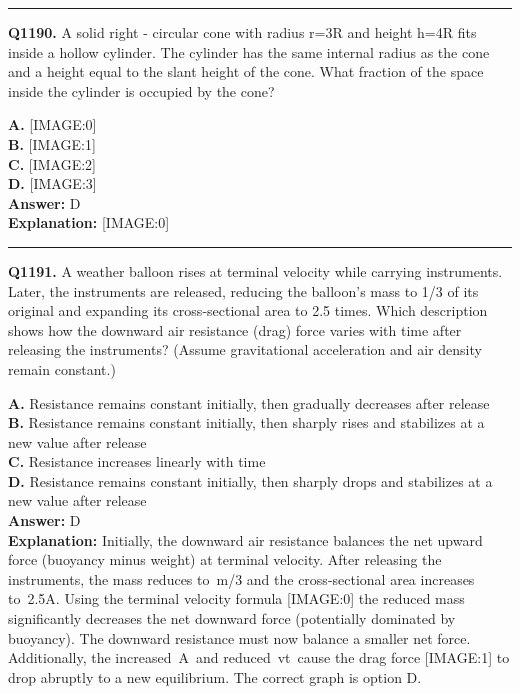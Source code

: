 \documentclass[12pt]{article}
\begin{document}
\hrule
\vspace{1em}


\noindent
\textbf{Q1190.} A solid right - circular cone with radius r=3R and height h=4R fits inside a hollow cylinder. The cylinder has the same internal radius as the cone and a height equal to the slant height of the cone. What fraction of the space inside the cylinder is occupied by the cone?



\textbf{A.} [IMAGE:0] \\
\textbf{B.} [IMAGE:1] \\
\textbf{C.} [IMAGE:2] \\
\textbf{D.} [IMAGE:3] \\

\textbf{Answer:} D \\
\textbf{Explanation:} [IMAGE:0]

\hrule
\vspace{1em}


\noindent
\textbf{Q1191.} A weather balloon rises at terminal velocity while carrying instruments. Later, the instruments are released, reducing the balloon’s mass to 1/3 of its original and expanding its cross-sectional area to 2.5 times. Which description shows how the downward air resistance (drag) force varies with time after releasing the instruments? (Assume gravitational acceleration and air density remain constant.)



\textbf{A.} Resistance remains constant initially, then gradually decreases after release \\
\textbf{B.} Resistance remains constant initially, then sharply rises and stabilizes at a new value after release \\
\textbf{C.} Resistance increases linearly with time \\
\textbf{D.} Resistance remains constant initially, then sharply drops and stabilizes at a new value after release \\

\textbf{Answer:} D \\
\textbf{Explanation:} Initially, the downward air resistance balances the net upward force (buoyancy minus weight) at terminal velocity. After releasing the instruments, the mass reduces to m/3
and the cross-sectional area increases to 2.5A. Using the terminal velocity formula
[IMAGE:0]
the reduced mass significantly decreases the net downward force (potentially dominated by buoyancy). The downward resistance must now balance a smaller net force. Additionally, the increased A and reduced vt cause the drag force
[IMAGE:1]
to drop abruptly to a new equilibrium. The correct graph is option D.
\end{document}
